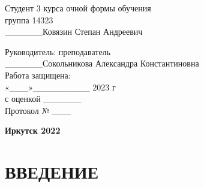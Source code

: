 \documentclass[12pt, oldlfont, amsfonts]{report}
\begin{document}
		\vspace{0.5em}
		
   \hspace{-5em} 



\begin{minipage}[t]{0.5\textwidth}
  \begin{flushleft}
  
		\end{flushleft}
\end{minipage}\hspace{1em} 
\begin{minipage}[t]{0.5\textwidth}
  \begin{flushleft}
  \linespread{1}
	\small{
    Студент 3 курса
	очной формы обучения \\
  группа 14323\\
	\_\_\_\_\_\_Ковязин Степан Андреевич\\
	\vspace{2em}
		
	Руководитель: преподаватель\\
		\_\_\_\_\_\_Сокольникова Александра Константиновна\\
\vspace{2em}
 Работа защищена:\\
	«\_\_\_»\_\_\_\_\_\_\_\_\_ 2023 г \\
 с оценкой \_\_\_\_\_\_\\
Протокол № \_\_\_}
		
		
		\end{flushleft}
\end{minipage}

    \vspace{\fill}
\vspace{1em}
    \begin{center}
   {\bf Иркутск 2022  }
    \end{center}
\newpage

\pagestyle{plain}%

\newpage
\setcounter{page}{2} 
\newpage

\tableofcontents %


\setcounter{chapter}{0}
\setcounter{subsection}{0}
\setcounter{equation}{0}
\setcounter{section}{0}

\chapter*{\large{{\centering ВВЕДЕНИЕ}}}
\end{document}

